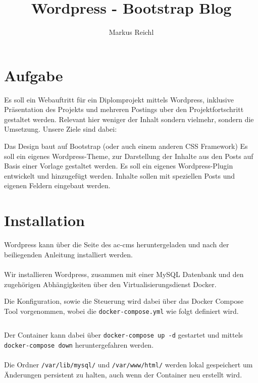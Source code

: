\documentclass[minted]{school}
\title{Wordpress - Bootstrap Blog}
\author{Markus Reichl}
\begin{document}
\thispagestyle{fancy}	%

\section{Aufgabe}
Es soll ein Webauftritt für ein Diplomprojekt mittels Wordpress, inklusive Präsentation des Projekts und mehreren Postings uber den Projektfortschritt gestaltet werden.
Relevant hier weniger der Inhalt sondern vielmehr, sondern die Umsetzung. Unsere Ziele sind dabei:
\begin{outline}
\1 Das Design baut auf Bootstrap (oder auch einem anderen CSS Framework)
\1 Es soll ein eigenes Wordpress-Theme, zur Darstellung der Inhalte aus den Posts auf Basis einer Vorlage gestaltet werden.
\1 Es soll ein eigenes Wordpress-Plugin entwickelt und hinzugefügt werden.
\1 Inhalte sollen mit speziellen Posts und eigenen Feldern eingebaut werden.
\end{outline}

\newpage
\section{Installation}
Wordpress\cite{wp} kann über die Seite\cite{wp-dl} des \gls{ac-cms} heruntergeladen und nach der beiliegenden Anleitung\cite{wp-help} installiert werden.
\\\\
Wir installieren Wordpress, zusammen mit einer MySQL\cite{mysql} Datenbank und den zugehörigen Abhängigkeiten über den Virtualisierungsdienst Docker\cite{docker}.

Die Konfiguration, sowie die Steuerung wird dabei über das Docker Compose\cite{docker-compose} Tool vorgenommen, wobei die \texttt{docker-compose.yml} wie folgt definiert wird.

\inputminted{yaml}{docker-compose.yml}

Der Container kann dabei über \texttt{docker-compose up -d} gestartet und mittels \texttt{docker-compose down} heruntergefahren werden.
\\\\
Die Ordner \verb|/var/lib/mysql/| und \verb|/var/www/html/| werden lokal gespeichert um Änderungen persistent zu halten, auch wenn der Container neu erstellt wird.

\newpage
\end{document}
